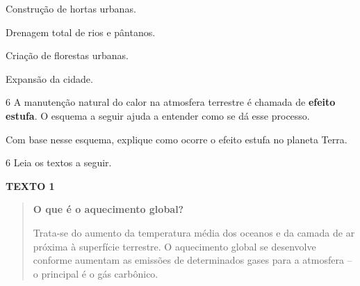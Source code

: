\begin{boxlist}
 Construção de hortas urbanas.

\boxitem{} Drenagem total de rios e pântanos.

 Criação de florestas urbanas.

\boxitem{} Expansão da cidade.
\end{boxlist}


\num{6} A manutenção natural do calor na atmosfera terrestre é chamada de
\textbf{efeito estufa}. O esquema a seguir ajuda a entender como se dá esse processo.


Com base nesse esquema, explique como ocorre o efeito estufa no planeta Terra.


\num{6} Leia os textos a seguir.

\textbf{TEXTO 1}
\begin{quote}
\textbf{O que é o aquecimento global?}

Trata-se do aumento da temperatura média dos oceanos e da camada de ar próxima à superfície terrestre. O aquecimento global se desenvolve conforme aumentam as emissões de determinados gases para a atmosfera -- o principal é o gás carbônico.

\end{quote}

